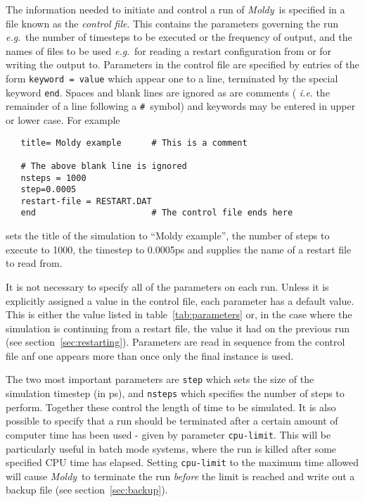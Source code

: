 \documentclass[twoside]{report}
\newcommand{\moldy}{{\em Moldy}}
\newcommand{\eg}{{\em e.g}.\ }
\begin{document}
The information needed to initiate and control a run of \moldy\  is
specified in a file known as the {\em control file}. This contains the
parameters governing the run \eg the number of timesteps to be
executed or the frequency of output, and the names of files to be used
\eg for reading a restart configuration from or for writing the
output to. Parameters in the control file are specified by entries of the form
\texttt{keyword = value}
which appear one to a line, terminated by the special keyword
\texttt{end}.  Spaces and blank lines are ignored as are comments ({\em
i.e}. the remainder of a line following a \texttt{\#}~symbol) and
keywords may be entered in upper or lower case. For example
\begin{verbatim}
   title= Moldy example      # This is a comment

   # The above blank line is ignored
   nsteps = 1000
   step=0.0005
   restart-file = RESTART.DAT
   end                       # The control file ends here
\end{verbatim}
sets the title of the simulation to ``Moldy example'', the number of
steps to execute to 1000, the timestep to 0.0005ps and supplies the
name of a restart file to read from.

It is not necessary to specify all of the parameters on each run.
Unless it is explicitly assigned a value in the control file, each
parameter has a default value.  This is either the value listed in
table~\ref{tab:parameters} or, in the case where the simulation is
continuing from a restart file, the value it had on the previous run
(see section~\ref{sec:restarting}). Parameters are read in sequence
from the control file anf one appears more than once only the final
instance is used.

The two most important parameters are \texttt{step} which sets the size
of the simulation timestep (in ps), and \texttt{nsteps} which specifies
the number of steps to perform.  Together these control the length of
time to be simulated.  It is also possible to specify that a run
should be terminated after a certain amount of computer time has been
used - given by parameter \texttt{cpu-limit}.  This will be particularly
useful in batch mode systems, where the run is killed after some
specified CPU time has elapsed.  Setting \texttt{cpu-limit} to the
maximum time allowed will cause \moldy\  to terminate the run {\em
before\/} the limit is reached and write out a backup file (see
section~\ref{sec:backup}).
\end{document}
